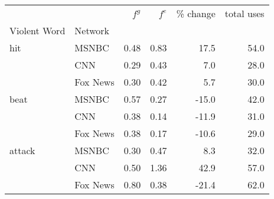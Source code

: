 \begin{tabular}{llrrrr}
\toprule
       &     & $f^g$ & $f^e$ & \% change &  total uses \\
Violent Word & Network &       &       &           &             \\
\midrule
hit & MSNBC &  0.48 &  0.83 &      17.5 &        54.0 \\
       & CNN &  0.29 &  0.43 &       7.0 &        28.0 \\
       & Fox News &  0.30 &  0.42 &       5.7 &        30.0 \\
beat & MSNBC &  0.57 &  0.27 &     -15.0 &        42.0 \\
       & CNN &  0.38 &  0.14 &     -11.9 &        31.0 \\
       & Fox News &  0.38 &  0.17 &     -10.6 &        29.0 \\
attack & MSNBC &  0.30 &  0.47 &       8.3 &        32.0 \\
       & CNN &  0.50 &  1.36 &      42.9 &        57.0 \\
       & Fox News &  0.80 &  0.38 &     -21.4 &        62.0 \\
\bottomrule
\end{tabular}
